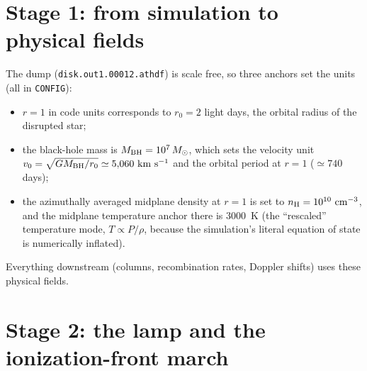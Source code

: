\documentclass[11pt]{article}
\newcommand{\nH}{n_{\rm H}}
\begin{document}
\section{Stage 1: from simulation to physical fields}

The dump (\texttt{disk.out1.00012.athdf}) is scale free, so three
anchors set the units (all in \texttt{CONFIG}):
\begin{itemize}
\item $r=1$ in code units corresponds to $r_0 = 2$ light days, the
      orbital radius of the disrupted star;
\item the black-hole mass is $M_{\rm BH} = 10^{7}\,M_\odot$, which
      sets the velocity unit $v_0 = \sqrt{GM_{\rm BH}/r_0} \simeq
      5{,}060~{\rm km~s^{-1}}$ and the orbital period at $r=1$
      ($\simeq 740$ days);
\item the azimuthally averaged midplane density at $r=1$ is set to
      $\nH = 10^{10}~{\rm cm^{-3}}$, and the midplane temperature
      anchor there is $3000$~K (the ``rescaled'' temperature mode,
      $T \propto P/\rho$, because the simulation's literal equation of
      state is numerically inflated).
\end{itemize}
Everything downstream (columns, recombination rates, Doppler shifts)
uses these physical fields.

\section{Stage 2: the lamp and the ionization-front march}
\end{document}
